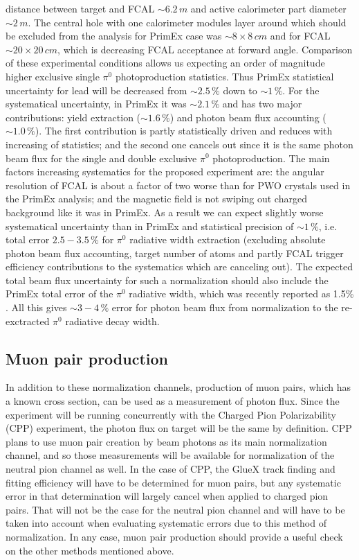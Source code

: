 distance between target and FCAL $\sim6.2\,m$ and active calorimeter
part diameter $\sim2\,m$.  The central hole with one calorimeter
modules layer around which should be excluded from the analysis for
PrimEx case was $\sim8\times8\,cm$ and for FCAL $\sim20\times20\,cm$,
which is decreasing FCAL acceptance at forward angle. Comparison of
these experimental conditions allows us expecting an order of
magnitude higher exclusive single $\pi^0$ photoproduction statistics.
Thus PrimEx statistical uncertainty for lead will be decreased from
$\sim2.5\,\%$ down to $\sim1\,\%$.  For the systematical uncertainty,
in PrimEx it was $\sim2.1\,\%$ and has two major contributions: yield
extraction ($\sim1.6\,\%$) and photon beam flux accounting
($\sim1.0\,\%$).  The first contribution is partly statistically
driven and reduces with increasing of statistics; and the second one
cancels out since it is the same photon beam flux for the single and
double exclusive $\pi^0$ photoproduction.  The main factors increasing
systematics for the proposed experiment are: the angular resolution of
FCAL is about a factor of two worse than for PWO crystals used in the
PrimEx analysis;
and the magnetic field is not swiping out charged background like it
was in PrimEx.  As a result we can expect slightly worse systematical
uncertainty than in PrimEx and statistical precision of $\sim1\,\%$,
i.e. total error $2.5-3.5\,\%$ for $\pi^0$ radiative width extraction
(excluding absolute photon beam flux accounting, target number of
atoms and partly FCAL trigger efficiency contributions to the
systematics which are canceling out).  The expected total beam flux
uncertainty for such a normalization should also include the PrimEx
total error of the $\pi^0$ radiative width, which was recently
reported as 1.5\% \cite{Larin:2018}.  All this gives $\sim3-4\,\%$
error for photon beam flux from normalization to the re-exctracted
$\pi^0$ radiative decay width.

\subsection{Muon pair production}
In addition to these normalization channels, production of muon pairs,
which has a known cross section, can be used as a measurement of
photon flux. Since the experiment will be running concurrently with
the Charged Pion Polarizability (CPP) experiment, the photon flux on
target will be the same by definition. CPP plans to use muon pair
creation by beam photons as its main normalization channel, and so
those measurements will be available for normalization of the neutral
pion channel as well. In the case of CPP, the GlueX track finding and
fitting efficiency will have to be determined for muon pairs, but any
systematic error in that determination will largely cancel when
applied to charged pion pairs. That will not be the case for the
neutral pion channel and will have to be taken into account when
evaluating systematic errors due to this method of normalization. In
any case, muon pair production should provide a useful check on the
other methods mentioned above.
